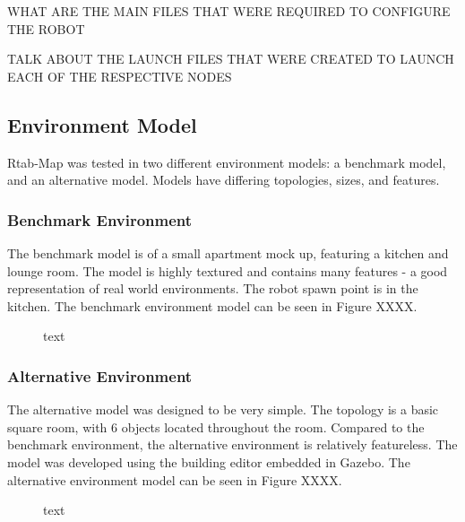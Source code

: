 \documentclass[a4paper]{article}
\begin{document}
\clearpage


WHAT ARE THE MAIN FILES THAT WERE REQUIRED TO CONFIGURE THE ROBOT

TALK ABOUT THE LAUNCH FILES THAT WERE CREATED TO LAUNCH EACH OF THE RESPECTIVE NODES

\subsection{Environment Model}
Rtab-Map was tested in two different environment models: a benchmark model, and an alternative model. Models have differing topologies, sizes, and features. 

\subsubsection{Benchmark Environment}
The benchmark model is of a small apartment mock up, featuring a kitchen and lounge room. The model is highly textured and contains many features - a good representation of real world environments. The robot spawn point is in the kitchen. The benchmark environment model can be seen in Figure XXXX.
\begin{figure}[h]
\centering
{}
\caption{text}
\end{figure}

\subsubsection{Alternative Environment}
The alternative model was designed to be very simple. The topology is a basic square room, with 6 objects located throughout the room. Compared to the benchmark environment, the alternative environment is relatively featureless. The model was developed using the building editor embedded in Gazebo. The alternative environment model can be seen in Figure XXXX.
\begin{figure}
\centering
\caption{text}
\end{figure}
\end{document}
